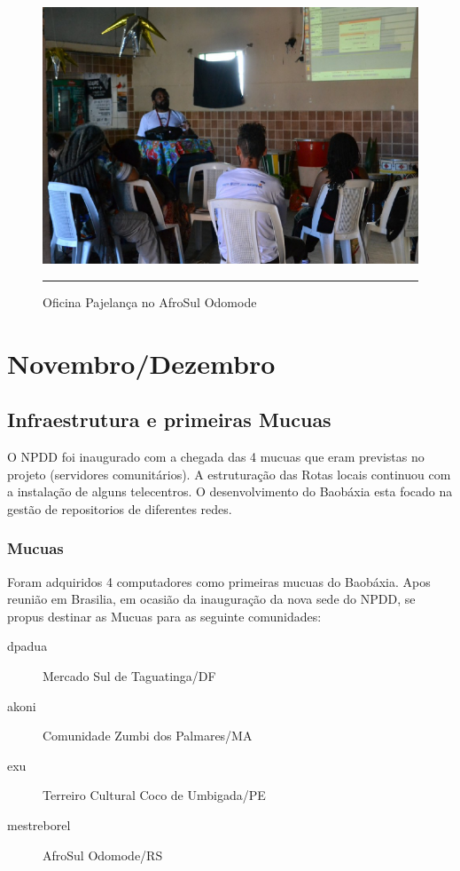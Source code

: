 \documentclass[a4paper, 11pt, oneside]{Relatorio_sem}  %
\begin{document}
\begin{figure}[htbp]
  \centering
  \includegraphics[width=\textwidth]{./Fig/PajelancaAfroSul_2.pdf}
  \rule{35em}{0.5pt}
  \caption[Oficina Pajelança no AfroSul Odomode]{Oficina Pajelança no AfroSul Odomode}
  \label{fig:PajelancaRS2}
\end{figure}






\part{Novembro/Dezembro} %
\chapter{Infraestrutura e primeiras Mucuas}
O NPDD foi inaugurado com a chegada das 4 mucuas que eram previstas no
projeto (servidores comunitários). A estruturação das Rotas locais
continuou com a instalação de alguns telecentros. O desenvolvimento do
Baobáxia esta focado na gestão de repositorios de diferentes redes.

\section{Mucuas}
Foram adquiridos 4 computadores como primeiras mucuas do
Baobáxia. Apos reunião em Brasilia, em ocasião da inauguração da nova
sede do NPDD, se propus destinar as Mucuas para as seguinte
comunidades:
\begin{description}
  \item[dpadua] Mercado Sul de Taguatinga/DF
  \item[akoni] Comunidade Zumbi dos Palmares/MA 
  \item[exu] Terreiro Cultural Coco de Umbigada/PE
  \item[mestreborel] AfroSul Odomode/RS
\end{description}
\end{document}
